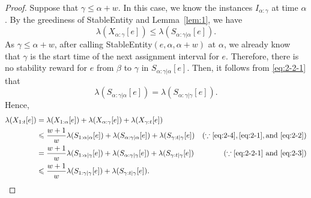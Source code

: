 \documentclass[11pt,a4paper]{article}
\renewcommand{\leq}{\leqslant}
\begin{document}
\begin{proof}
	Suppose that $\gamma \leq \alpha+w$.   In this case, we know the instances $I_{\alpha:\gamma}$ at time $\alpha$.  By the greediness of StableEntity and Lemma~\ref{lem:1}, we have 
	\begin{equation}
		\lambda(X_{\alpha:\gamma}[e]) \leq \lambda(S_{\alpha:\gamma|\alpha}[e]).  \label{eq:2-2}
	\end{equation}
	As $\gamma \leq \alpha+w$, after calling StableEntity$(e,\alpha,\alpha+w)$ at $\alpha$, we already know that $\gamma$ is the start time of the next assignment interval for $e$.  
	Therefore, 
	there is no stability reward for $e$ from $\beta$ to $\gamma$ in $S_{\alpha:\gamma|\alpha}[e]$.
	Then, it follows from \eqref{eq:2-2-1} that 
	\begin{equation}
		\lambda(S_{\alpha:\gamma|\alpha}[e]) = \lambda(S_{\alpha:\gamma|\gamma}[e]).  \label{eq:2-3}
	\end{equation}
	Hence,
	\begin{align*}
		\lambda(X_{1:t}[e]) 
		& = \lambda(X_{1:\alpha}[e]) + \lambda(X_{\alpha:\gamma}[e]) + \lambda(X_{\gamma:t}[e]) \\
		& \leq \frac{w+1}{w}\lambda(S_{1:\alpha|\alpha}[e]) + \lambda(S_{\alpha:\gamma|\alpha}[e]) + \lambda(S_{\gamma:t|\gamma}[e])  & (\because \eqref{eq:2-4}, \eqref{eq:2-1}, \text{and}~\eqref{eq:2-2}) \\
		& = \frac{w+1}{w}\lambda(S_{1:\alpha|\gamma}[e]) + \lambda(S_{\alpha:\gamma|\gamma}[e]) + \lambda(S_{\gamma:t|\gamma}[e])   & (\because \eqref{eq:2-2-1}~\text{and}~\eqref{eq:2-3}) \\
		& \leq \frac{w+1}{w}\lambda(S_{1:\gamma|\gamma}[e]) + \lambda(S_{\gamma:t|\gamma}[e]).
	\end{align*}
	

\end{proof}
\end{document}
